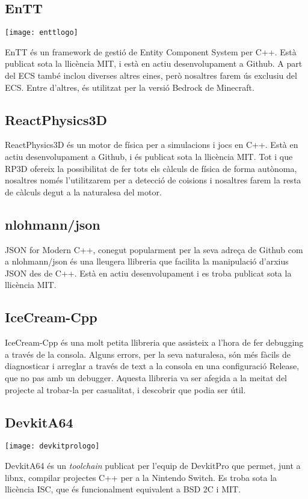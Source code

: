 \subsection{EnTT}
\begin{center}
  \texttt{[image: enttlogo]}
\end{center}
EnTT és un framework de gestió de Entity Component System per C++. Està publicat sota la llicència MIT, i està en actiu desenvolupament a Github. A part del ECS també inclou diverses altres eines, però nosaltres farem ús exclusiu del ECS. Entre d'altres, és utilitzat per la versió Bedrock de Minecraft.
\subsection{ReactPhysics3D}
ReactPhysics3D és un motor de física per a simulacions i jocs en C++. Està en actiu desenvolupament a Github, i és publicat sota la llicència MIT. Tot i que RP3D ofereix la possibilitat de fer tots els càlculs de física de forma autònoma, nosaltres només l'utilitzarem per a detecció de co\lgem isions i nosaltres farem la resta de càlculs degut a la naturalesa del motor.
\subsection{nlohmann/json}
JSON for Modern C++, conegut popularment per la seva adreça de Github com a nlohmann/json és una lleugera llibreria que facilita la manipulació d'arxius JSON des de C++. Està en actiu desenvolupament i es troba publicat sota la llicència MIT.
\subsection{IceCream-Cpp}
IceCream-Cpp és una molt petita llibreria que assisteix a l'hora de fer debugging a través de la consola. Alguns errors, per la seva naturalesa, són més fàcils de diagnosticar i arreglar a través de text a la consola en una configuració Release, que no pas amb un debugger. Aquesta llibreria va ser afegida a la meitat del projecte al trobar-la per casualitat, i descobrir que podia ser útil.
\subsection{DevkitA64}
\begin{center}
  \texttt{[image: devkitprologo]}
\end{center}
DevkitA64 és un \textit{toolchain} publicat per l'equip de DevkitPro que permet, junt a libnx, compilar projectes C++ per a la Nintendo Switch. Es troba sota la llicència ISC, que és funcionalment equivalent a BSD 2C i MIT.


